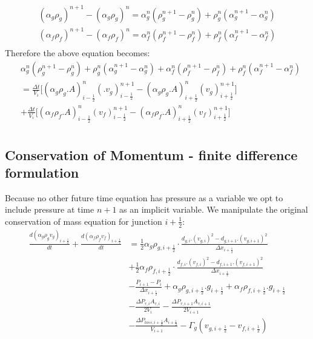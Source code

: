 \documentclass[11pt,letterpaper,titlepage]{article}
\newcommand{\half}{\frac{1}{2}}
\begin{document}
\begin{equation*}
\begin{aligned}
(\alpha_g \rho_g)^{n+1}-(\alpha_g \rho_g)^{n} = \alpha_g^n (\rho_g^{n+1}-\rho_g^n)+\rho_g^n(\alpha_g^{n+1}-\alpha_g^n)\\
(\alpha_f \rho_f)^{n+1}-(\alpha_f \rho_f)^{n} = \alpha_f^n (\rho_f^{n+1}-\rho_f^n)+\rho_f^n(\alpha_f^{n+1}-\alpha_f^n)\\
\end{aligned}
\end{equation*}
\newline
\noindent Therefore the above equation becomes:
\begin{equation} \label{eq:mixmass}
\begin{aligned}
&\alpha_g^n (\rho_g^{n+1}-\rho_g^n)+\rho_g^n(\alpha_g^{n+1}-\alpha_g^n)
+\alpha_f^n (\rho_f^{n+1}-\rho_f^n)+\rho_f^n(\alpha_f^{n+1}-\alpha_f^n)\\
&= \frac{\Delta t}{V_i}\biggr[(\alpha_g\rho_g.A)_{i-\half}^{n} (.v_g)_{i-\half}^{n+1}
-(\alpha_g\rho_g.A)_{i+\half}^{n} (v_g)_{i+\half}^{n+1} \biggr]\\
&+ \frac{\Delta t}{V_i}\biggr[(\alpha_f\rho_f.A)_{i-\half}^{n} (v_f)_{i-\half}^{n+1}
-(\alpha_f\rho_f.A)_{i+\half}^{n} (v_f)_{i+\half}^{n+1} \biggr]\\
\end{aligned}
\end{equation}


\vspace{1cm}
\subsection{Conservation of Momentum - finite difference formulation}
Because no other future time equation has pressure as a variable we opt to include pressure at time $n+1$ as an implicit variable. We manipulate the original conservation of mass equation for junction $i+\half$:
\begin{equation*}
\begin{aligned}
\frac{d(\alpha_g\rho_g v_g)_{i+\half}}{dt}+\frac{d(\alpha_f\rho_f v_f)_{i+\half}}{dt}
&=\half \alpha_g \rho_{g,i+\half} \cdot\frac{d_{g,i}.(v_{g,i})^2-d_{g,i+1}.(v_{g,i+1})^2}{\Delta x_{i+\half}} \\
&+\half \alpha_f \rho_{f,i+\half} \cdot\frac{d_{f,i}.(v_{f,i})^2-d_{f,i+1}.(v_{f,i+1})^2}{\Delta x_{i+\half}} \\
&-\frac{P_{i+1}-P_i}{\Delta x_{i+\half}} + \alpha_g \rho_{g,i+\half}.g_{i+\half} + \alpha_f\rho_{f,i+\half}.g_{i+\half}\\
&-\frac{\Delta P_{\tau,i}A_{\tau,i}}{2V_i}-\frac{\Delta P_{\tau,i+1}A_{\tau,i+1}}{2V_{i+1}} \\
&-\frac{\Delta P_{loss,i+\half}A_{i+\half}}{V_{i+1}} - \Gamma_g (v_{g,i+\half} - v_{f,i+\half})
\end{aligned}
\end{equation*}
\end{document}
